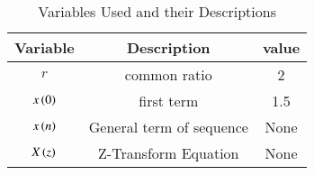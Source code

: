 \documentclass[journal,12pt,twocolumn]{IEEEtran}
\theoremstyle{remark}
\begin{document}
\begin{table}[ht]
\renewcommand\thetable{1}
    \centering
    \begin{tabular}{|c|c|c|}
    \hline
        Variable&             Description&value\\\hline
             $r$&            common ratio&2    \\\hline
     $x\left(0\right)$&              first term&1.5  \\\hline
     $x\left(n\right)$&General term of sequence&None \\\hline
     $X\left(z\right)$&    Z-Transform Equation&None \\\hline
    \end{tabular}
    \vspace{0.3cm}
    \caption{Variables Used and their Descriptions}
    \label{table 11.9.3.2.1}
\end{table}
\end{document}
